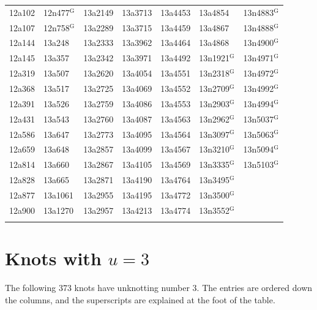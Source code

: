 \documentclass[12pt, oneside]{amsart}
\newcommand{\nUthree}{373}
\begin{document}
{\begin{longtable}{*{7}{>{\raggedright\arraybackslash}p{}}}
12a102 & 12n477$^{\mathrm{G}}$ & 13a2149 & 13a3713 & 13a4453 & 13a4854 & 13n4883$^{\mathrm{G}}$ \\
12a107 & 12n758$^{\mathrm{G}}$ & 13a2289 & 13a3715 & 13a4459 & 13a4867 & 13n4888$^{\mathrm{G}}$ \\
12a144 & 13a248 & 13a2333 & 13a3962 & 13a4464 & 13a4868 & 13n4900$^{\mathrm{G}}$ \\
12a145 & 13a357 & 13a2342 & 13a3971 & 13a4492 & 13n1921$^{\mathrm{G}}$ & 13n4971$^{\mathrm{G}}$ \\
12a319 & 13a507 & 13a2620 & 13a4054 & 13a4551 & 13n2318$^{\mathrm{G}}$ & 13n4972$^{\mathrm{G}}$ \\
12a368 & 13a517 & 13a2725 & 13a4069 & 13a4552 & 13n2709$^{\mathrm{G}}$ & 13n4992$^{\mathrm{G}}$ \\
12a391 & 13a526 & 13a2759 & 13a4086 & 13a4553 & 13n2903$^{\mathrm{G}}$ & 13n4994$^{\mathrm{G}}$ \\
12a431 & 13a543 & 13a2760 & 13a4087 & 13a4563 & 13n2962$^{\mathrm{G}}$ & 13n5037$^{\mathrm{G}}$ \\
12a586 & 13a647 & 13a2773 & 13a4095 & 13a4564 & 13n3097$^{\mathrm{G}}$ & 13n5063$^{\mathrm{G}}$ \\
12a659 & 13a648 & 13a2857 & 13a4099 & 13a4567 & 13n3210$^{\mathrm{G}}$ & 13n5094$^{\mathrm{G}}$ \\
12a814 & 13a660 & 13a2867 & 13a4105 & 13a4569 & 13n3335$^{\mathrm{G}}$ & 13n5103$^{\mathrm{G}}$ \\
12a828 & 13a665 & 13a2871 & 13a4190 & 13a4764 & 13n3495$^{\mathrm{G}}$ &  \\*
12a877 & 13a1061 & 13a2955 & 13a4195 & 13a4772 & 13n3500$^{\mathrm{G}}$ &  \\*
12a900 & 13a1270 & 13a2957 & 13a4213 & 13a4774 & 13n3552$^{\mathrm{G}}$ &  \\*
\multicolumn{7}{@{}l@{}}{\usebox{\appendixLegendBox}} \\
\end{longtable}}


\section{Knots with \texorpdfstring{$u=3$}{u=3}}\label{app:u3}
The following \nUthree{} knots have unknotting number $3$.  The entries are ordered down the
columns, and the superscripts are explained at the foot of the table.
\end{document}
